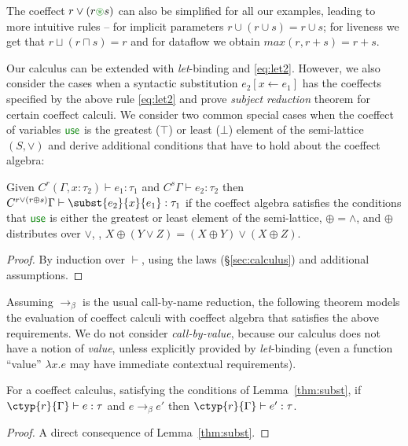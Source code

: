 The coeffect $r \vee (r \cseq s)$ can
also be simplified for all our examples, leading to more intuitive
rules -- for implicit parameters $r \cup (r \cup s) = r \cup s$; for
liveness we get that $r \sqcup (r \sqcap s) = r$ and for dataflow we
obtain $\textit{max}(r, r+s) = r + s$.

Our calculus can be extended with \emph{let}-binding and \eqref{eq:let2}.
However, we also consider the cases when a
syntactic substitution $e_2[x \leftarrow e_1]$ has the coeffects
specified by the above rule \eqref{eq:let2} 
and prove \emph{subject reduction} theorem
for certain coeffect calculi.  We consider two common special cases
when the coeffect of variables $\cunit$ is the greatest ($\top$) or
least ($\bot$) element of the semi-lattice $(S, \vee)$ and derive
additional conditions that have to hold about the coeffect algebra:

\begin{lemma}[Substitution]
\label{thm:subst}
Given $C^r (\Gamma, x : \tau_2) \vdash e_1 : \tau_1$ and $C^s \Gamma \vdash e_2 : \tau_2$
then $C^{r \vee (r \oplus s)} \Gamma \vdash \subst{e_2}{x}{e_1} : \tau_1$ if 
the coeffect algebra satisfies the conditions that 
$\cunit$ is either the greatest or least element of the semi-lattice,
$\oplus = \wedge$, and $\oplus$ distributes over $\vee$,
\ie{}, $X \oplus (Y \vee Z) = (X \oplus Y) \vee (X \oplus Z)$.
\end{lemma}

\begin{proof}
By induction over $\vdash$, using the laws (\S\ref{sec:calculus}) and additional assumptions.
\end{proof}

Assuming $\rightarrow_\beta$ is the usual call-by-name reduction, the
following theorem models the evaluation of coeffect calculi with
coeffect algebra that satisfies the above requirements. We do not
consider \emph{call-by-value}, because our calculus does not have a
notion of \emph{value}, unless explicitly provided by
\emph{let}-binding (even a function ``value'' $\lambda x.e$ may have
immediate contextual requirements).

\begin{theorem}
\label{thm:reduction}
For a coeffect calculus, satisfying the conditions of Lemma~\ref{thm:subst}, if
$\ctyp{r}{\Gamma} \vdash e : \tau$ and $e \rightarrow_\beta e'$ then 
$\ctyp{r}{\Gamma} \vdash e' : \tau$.
\end{theorem}
\begin{proof}
A direct consequence of Lemma~\ref{thm:subst}. 
\end{proof}

